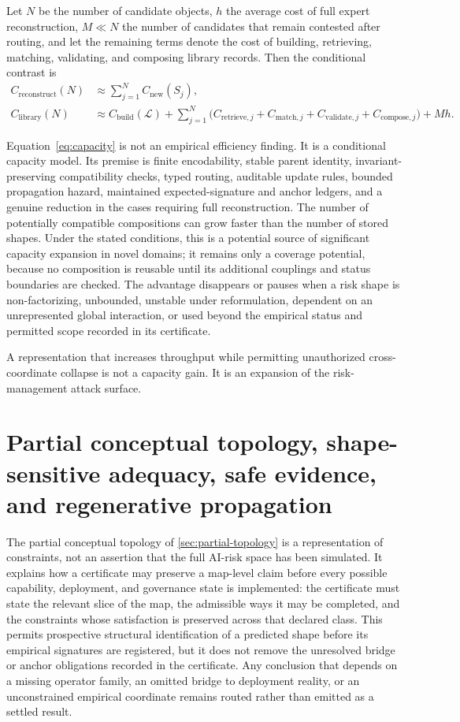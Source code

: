 \documentclass[11pt]{article}
\begin{document}
Let $N$ be the number of candidate objects, $h$ the average cost of full expert reconstruction, $M\ll N$ the number of candidates that remain contested after routing, and let the remaining terms denote the cost of building, retrieving, matching, validating, and composing library records. Then the conditional contrast is
\begin{align}
C_{\mathrm{reconstruct}}(N)&\approx \sum_{j=1}^{N}C_{\mathrm{new}}(S_j),\\
C_{\mathrm{library}}(N)&\approx C_{\mathrm{build}}(\mathcal{L})+\sum_{j=1}^{N}\bigl(C_{\mathrm{retrieve},j}+C_{\mathrm{match},j}+C_{\mathrm{validate},j}+C_{\mathrm{compose},j}\bigr)+Mh.
\label{eq:capacity}
\end{align}

Equation~\eqref{eq:capacity} is not an empirical efficiency finding. It is a conditional capacity model. Its premise is finite encodability, stable parent identity, invariant-preserving compatibility checks, typed routing, auditable update rules, bounded propagation hazard, maintained expected-signature and anchor ledgers, and a genuine reduction in the cases requiring full reconstruction. The number of potentially compatible compositions can grow faster than the number of stored shapes. Under the stated conditions, this is a potential source of significant capacity expansion in novel domains; it remains only a coverage potential, because no composition is reusable until its additional couplings and status boundaries are checked. The advantage disappears or pauses when a risk shape is non-factorizing, unbounded, unstable under reformulation, dependent on an unrepresented global interaction, or used beyond the empirical status and permitted scope recorded in its certificate.

A representation that increases throughput while permitting unauthorized cross-coordinate collapse is not a capacity gain. It is an expansion of the risk-management attack surface.

\section{Partial conceptual topology, shape-sensitive adequacy, safe evidence, and regenerative propagation}
\label{sec:composition}

The partial conceptual topology of \cref{sec:partial-topology} is a representation of constraints, not an assertion that the full AI-risk space has been simulated. It explains how a certificate may preserve a map-level claim before every possible capability, deployment, and governance state is implemented: the certificate must state the relevant slice of the map, the admissible ways it may be completed, and the constraints whose satisfaction is preserved across that declared class. This permits prospective structural identification of a predicted shape before its empirical signatures are registered, but it does not remove the unresolved bridge or anchor obligations recorded in the certificate. Any conclusion that depends on a missing operator family, an omitted bridge to deployment reality, or an unconstrained empirical coordinate remains routed rather than emitted as a settled result.
\end{document}
